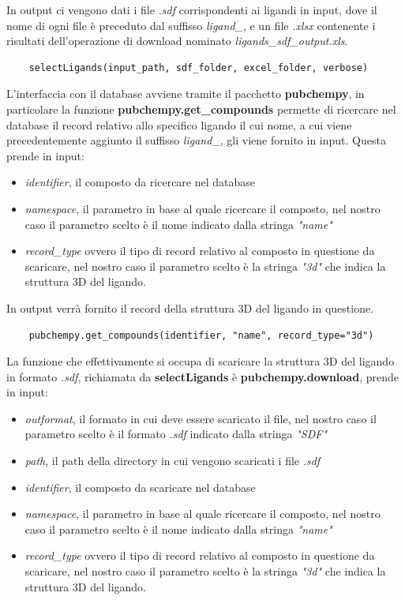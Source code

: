In output ci vengono dati i file \textit{.sdf} corrispondenti ai ligandi in input, dove il nome di ogni file è preceduto dal suffisso \textit{ligand\_}, e un file \textit{.xlsx} contenente i risultati dell'operazione di download nominato \textit{ligands\_sdf\_output.xls}.

\begin{verbatim}
    selectLigands(input_path, sdf_folder, excel_folder, verbose)
\end{verbatim}

L'interfaccia con il database avviene tramite il pacchetto \textbf{pubchempy}, in particolare la funzione \textbf{pubchempy.get\_compounds} permette di ricercare nel database il record relativo allo specifico ligando il cui nome, a cui viene precedentemente aggiunto il suffisso \textit{ligand\_}, gli viene fornito in input. Questa prende in input:

\begin{itemize}
    \item \textit{identifier}, il composto da ricercare nel database
    \item \textit{namespace}, il parametro in base al quale ricercare il composto, nel nostro caso il parametro scelto è il nome indicato dalla stringa \textit{"name"}
    \item \textit{record\_type} ovvero il tipo di record relativo al composto in questione da scaricare, 
    nel nostro caso il parametro scelto è la stringa \textit{"3d"} che indica la struttura 3D del ligando.
\end{itemize}

In output verrà fornito il record della struttura 3D del ligando in questione.

\begin{verbatim}
    pubchempy.get_compounds(identifier, "name", record_type="3d")
\end{verbatim}

La funzione che effettivamente si occupa di scaricare la struttura 3D del ligando in formato \textit{.sdf}, richiamata da \textbf{selectLigands} è \textbf{pubchempy.download}, prende in input:

\begin{itemize}
    \item \textit{outformat}, il formato in cui deve essere scaricato il file,  nel nostro caso il parametro scelto è il formato \textit{.sdf} indicato dalla stringa \textit{"SDF"}
    \item \textit{path}, il path della directory in cui vengono scaricati i file \textit{.sdf}
    \item \textit{identifier}, il composto da scaricare nel database
    \item \textit{namespace}, il parametro in base al quale ricercare il composto, nel nostro caso il parametro scelto è il nome indicato dalla stringa \textit{"name"}
    \item \textit{record\_type} ovvero il tipo di record relativo al composto in questione da scaricare, 
    nel nostro caso il parametro scelto è la stringa \textit{"3d"} che indica la struttura 3D del ligando.
\end{itemize}

